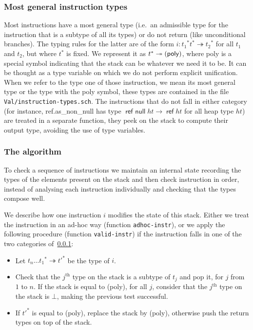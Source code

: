 \documentclass[a4paper,11pt]{article}
\DeclareMathOperator{\reft}{\textsf{ref}}
\DeclareMathOperator{\refnullt}{\textsf{ref null}}
\begin{document}
\subsubsection{Most general instruction types}\label{mgt}
Most instructions have a most general type (i.e.\ an admissible type for the
instruction that is a subtype of all its types) or do not return (like
unconditional branches). The typing rules for the latter are of the form
$i:{t_1}^*t^*\twoheadrightarrow {t_2}^*$ for all $t_1$ and $t_2$, but where
$t^*$ is fixed. We represent it as $t^*\twoheadrightarrow
(\text{\textsf{poly}})$, where \textsf{poly} is a special symbol indicating that
the stack can be whatever we need it to be. It can be thought as a type variable
on which we do not perform explicit unification. When we refer to the type one
of those instruction, we mean its most general type or the type with the
\textsf{poly} symbol, these types are contained in the file
\texttt{Val/instruction-types.sch}. The instructions that do not fall in either
category (for instance, \textsf{ref.as\_non\_null} has type $\refnullt ht\to
\reft ht$ for all heap type $ht$) are treated in a separate function, they peek
on the stack to compute their output type, avoiding the use of type variables.

\subsubsection{The algorithm}
To check a sequence of instructions we maintain an internal state recording the
types of the elements present on the stack and then check instruction in order,
instead of analysing each instruction individually and checking that the types
compose well.

We describe how one instruction $i$ modifies the state of this stack. Either we
treat the instruction in an ad-hoc way (function \texttt{adhoc-instr}), or we
apply the following procedure (function \texttt{valid-instr}) if the instruction
falls in one of the two categories of~\ref{mgt}:
\begin{itemize}\setlength{\itemsep}{0pt}
\item Let ${t_n\ldots t_1}^*\twoheadrightarrow{t'}^*$ be the type of $i$.
\item Check that the $j^{\text{th}}$ type on the stack is a subtype of $t_j$ and
  pop it, for $j$ from $1$ to $n$. If the stack is equal to \textsf{(poly)}, for
  all $j$, consider that the $j^{\text{th}}$ type on the stack is $\bot$, making
  the previous test successful.
\item If ${t'}^*$ is equal to \textsf{(poly)}, replace the stack by
  \textsf{(poly)}, otherwise push the return types on top of the stack.
\end{itemize}
\end{document}
